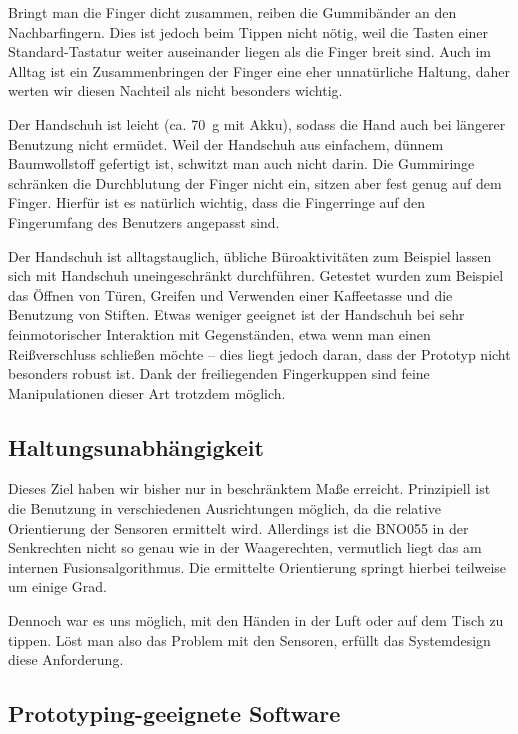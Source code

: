 Bringt man die Finger dicht zusammen, reiben die Gummibänder an den
Nachbarfingern. Dies ist jedoch beim Tippen nicht nötig, weil die Tasten einer
Standard-Tastatur weiter auseinander liegen als die Finger breit sind. Auch im
Alltag ist ein Zusammenbringen der Finger eine eher unnatürliche Haltung, daher
werten wir diesen Nachteil als nicht besonders wichtig.

Der Handschuh ist leicht (ca. \SI{70}{g} mit Akku), sodass die Hand auch bei
längerer Benutzung nicht ermüdet. Weil der Handschuh aus einfachem, dünnem
Baumwollstoff gefertigt ist, schwitzt man auch nicht darin. Die Gummiringe
schränken die Durchblutung der Finger nicht ein, sitzen aber fest genug auf dem
Finger.  Hierfür ist es natürlich wichtig, dass die Fingerringe auf den
Fingerumfang des Benutzers angepasst sind.

Der Handschuh ist alltagstauglich, übliche Büroaktivitäten zum Beispiel lassen
sich mit Handschuh uneingeschränkt durchführen. Getestet wurden zum Beispiel
das Öffnen von Türen, Greifen und Verwenden einer Kaffeetasse und die Benutzung
von Stiften. Etwas weniger geeignet ist der Handschuh bei sehr feinmotorischer
Interaktion mit Gegenständen, etwa wenn man einen Reißverschluss schließen
möchte -- dies liegt jedoch daran, dass der Prototyp nicht besonders robust
ist. Dank der freiliegenden Fingerkuppen sind feine Manipulationen dieser Art
trotzdem möglich.

\subsection{Haltungsunabhängigkeit}

Dieses Ziel haben wir bisher nur in beschränktem Maße erreicht. Prinzipiell ist
die Benutzung in verschiedenen Ausrichtungen möglich, da die relative
Orientierung der Sensoren ermittelt wird. Allerdings ist die BNO055 in der
Senkrechten nicht so genau wie in der Waagerechten, vermutlich liegt das am
internen Fusionsalgorithmus. Die ermittelte Orientierung springt hierbei
teilweise um einige Grad.

Dennoch war es uns möglich, mit den Händen in der Luft oder auf dem Tisch zu
tippen. Löst man also das Problem mit den Sensoren, erfüllt das Systemdesign
diese Anforderung.

\subsection{Prototyping-geeignete Software}

